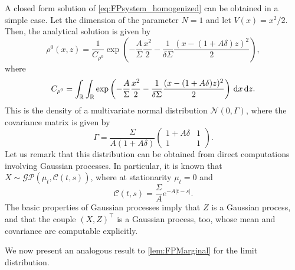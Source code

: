 \documentclass[review,onefignum,onetabnum]{siamonline190516}
\begin{document}
\begin{example}\label{ex:OrnUhl} A closed form solution of \eqref{eq:FPsystem_homogenized} can be obtained in a simple case. Let the dimension of the parameter $N=1$ and let $V(x) = x^2/2$. Then, the analytical solution is given by
	\begin{equation}
	\rho^0(x,z) = \frac{1}{C_{\rho^0}} \exp\left(-\frac{A}{\Sigma} \frac{x^2}{2} - \frac{1}{\delta \Sigma} \frac{(x - (1+A \delta)z)^2}{2}\right),
	\end{equation}
	where
	\begin{equation}
	C_{\rho^0} = \int_{\mathbb{R}} \int_{\mathbb{R}} \exp\left(-\frac{A}{\Sigma} \frac{x^2}{2} - \frac{1}{\delta \Sigma} \frac{(x - (1+A \delta)z)^2}{2}\right) \,\mathrm{d} x \,\mathrm{d} z.
	\end{equation}
	This is the density of a multivariate normal distribution $\mathcal N(0, \Gamma)$, where the covariance matrix is given by
	\begin{equation}
	\Gamma = \frac{\Sigma}{A (1 + A\delta)} \begin{pmatrix} 1+A\delta & 1 \\ 1 & 1 \end{pmatrix}.
	\end{equation}
	Let us remark that this distribution can be obtained from direct computations involving Gaussian processes. In particular, it is known that $X \sim \mathcal{GP}(\mu_t, \mathcal C(t, s))$, where at stationarity $\mu_t = 0$ and
	\begin{equation}
	\mathcal C(t, s) = \frac{\Sigma}{A} e^{-A|t-s|}.
	\end{equation}
	The basic properties of Gaussian processes imply that $Z$ is a Gaussian process, and that the couple $(X, Z)^\top$ is a Gaussian process, too, whose mean and covariance are computable explicitly.
\end{example}

We now present an analogous result to \cref{lem:FPMarginal} for the limit distribution.
\end{document}
